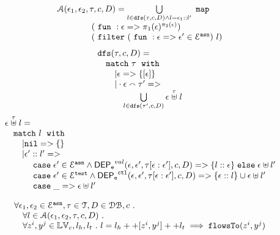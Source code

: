 \begin{defn}
\[
\begin{array}{l}
	\mathcal{A}(\mathtt{\epsilon}_1, \mathtt{\epsilon}_2, \mathtt{\tau}, c, D)
	= 
	\bigcup\limits_{l \in \mathtt{dfs}(\mathtt{\tau}, c, D) \land l = \mathtt{\epsilon}_1 :: l'}
	~\mathtt{map}~ 
	\\ \qquad \qquad
	(~\mathtt{fun}~ : \mathtt{\epsilon} => \pi_1(\mathtt{\epsilon})^{\pi_2(\mathtt{\epsilon})})	
	\\ \qquad \qquad
	(~\mathtt{filter}~ 
		(~\mathtt{fun}~ : \mathtt{\epsilon} =>  \mathtt{\epsilon}' \in \mathcal{E}^{\mathtt{{asn}}}) ~ l)
	\end{array}
\]
%
%
\[
\begin{array}{l}
	\mathtt{dfs}(\mathtt{\tau}, c, D)
	= 
	\\ \quad
	\mathtt{match}~  \mathtt{\tau} ~ \;\mathtt{with}\;
	\\ \qquad
	| \mathtt{\epsilon} => \{[\mathtt{\epsilon}]\}
	\\ \qquad
	|  \cdot \mathtt{\epsilon} \smallfrown \mathtt{\tau}' =>  
	\\ \quad \qquad
	\bigcup\limits_{l \in \mathtt{dfs}(\mathtt{\tau}', c, D) }
	\mathtt{\epsilon} \stackrel{\mathtt{\tau}}{\uplus} l 
\end{array}
\]
%
%
\[
\begin{array}{l}
	\mathtt{\epsilon} \stackrel{\mathtt{\tau}}{\uplus} l
	= 
	\\ \quad
	\mathtt{match}~  l ~ \;\mathtt{with}\;
	\\ \qquad
	| \mathtt{nil} => 	\{\}
	\\ \qquad
	|  \mathtt{\epsilon}' :: l' =>  
	\\ \quad \qquad 	
	\mathtt{\;case\;} \mathtt{\epsilon}' \in \mathcal{E}^{\mathtt{{asn}}}  \land \mathsf{DEP_{\mathtt{e}}}^{val}(\mathtt{\epsilon}, \mathtt{\epsilon}', \mathtt{\tau}[\mathtt{\epsilon}:\mathtt{\epsilon}'], c, D)
	=> \{l::\mathtt{\epsilon}\}
	\mathtt{\;else\;} \mathtt{\epsilon} \uplus l' 
	\\ \quad \qquad 	
	\mathtt{\;case\;} \mathtt{\epsilon}' \in \mathcal{E}^{\mathtt{{test}}} \land \mathsf{DEP_{\mathtt{e}}}^{\mathtt{{ctl}}}(\mathtt{\epsilon}, \mathtt{\epsilon}', \mathtt{\tau}[\mathtt{\epsilon}:\mathtt{\epsilon}'], c, D)
	=> \{\mathtt{\epsilon} :: l\} \cup \mathtt{\epsilon} \uplus l'
	\\ \quad \qquad 	
	\mathtt{\;case\;} \_ =>\mathtt{\epsilon} \uplus l' 
\end{array}
\]
\end{defn}
%
\begin{thm}
\label{thm:alg_correct}
\[
\begin{array}{l}
  \forall \mathtt{\epsilon}_1, \mathtt{\epsilon}_2 \in \mathcal{E}^{\mathtt{{asn}}}, \mathtt{\tau} \in \mathcal{T}, D \in \mathcal{DB} , c ~.~
  \\ \quad 
   \forall l \in \mathcal{A}(\mathtt{\epsilon}_1, \mathtt{\epsilon}_2, \mathtt{\tau}, c, D) ~.~
   \\ \quad 
   \forall z^i, y^j \in \mathbb{LV}_c, l_h, l_t ~.~ 
   l = l_h ++ [z^i, y^j] ++ l_t 
   \implies \mathtt{flowsTo}(z^i, y^j)
\end{array}
\]
\end{thm}
